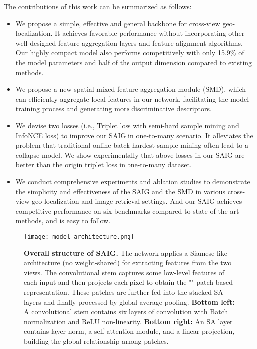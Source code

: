 \documentclass[sn-basic,iicol]{sn-jnl}
\theoremstyle{thmstyletwo}\newtheorem{example}{Example}\newtheorem{remark}{Remark}
\theoremstyle{thmstylethree}\newtheorem{definition}{Definition}
\begin{document}
The contributions of this work can be summarized as follows:
\begin{itemize}
\item We propose a simple, effective and general backbone for cross-view geo-localization. It achieves favorable performance without incorporating other well-designed feature aggregation layers and feature alignment algorithms. Our highly compact model also performs competitively with only 15.9\% of the model parameters and half of the output dimension compared to existing methods.

\item We propose a new spatial-mixed feature aggregation module (SMD), which can efficiently aggregate local features in our network, facilitating the model training process and generating more discriminative descriptors.

\item We devise two losses (i.e., Triplet loss with semi-hard sample mining and InfoNCE loss) to improve our SAIG in one-to-many scenario. It alleviates the problem that traditional online batch hardest sample mining often lead to a collapse model. We show experimentally that above losses in our SAIG are better than the origin triplet loss in one-to-many dataset.

\item We conduct comprehensive experiments and ablation studies to demonstrate the simplicity and effectiveness of the SAIG and the SMD in various cross-view geo-localization and image retrieval settings. And our SAIG achieves competitive performance on six benchmarks compared to state-of-the-art methods, and is easy to follow.
\end{itemize}

\begin{figure*}
\centering
\texttt{[image: model\_architecture.png]}
\caption{\textbf{Overall structure of SAIG.} The network applies a Siamese-like architecture (no weight-shared) for extracting features from the two views. The convolutional stem captures some low-level features of each input and then projects each pixel to obtain the "" patch-based representation. These patches are further fed into the stacked SA layers and finally processed by global average pooling. \textbf{Bottom left:} A convolutional stem contains six layers of  convolution with Batch normalization and ReLU non-linearity. \textbf{Bottom right:} An SA layer contains layer norm, a self-attention module, and a linear projection, building the global relationship among patches.} 
\label{model_architecture}
\vspace{-3pt}
\end{figure*}
\end{document}
